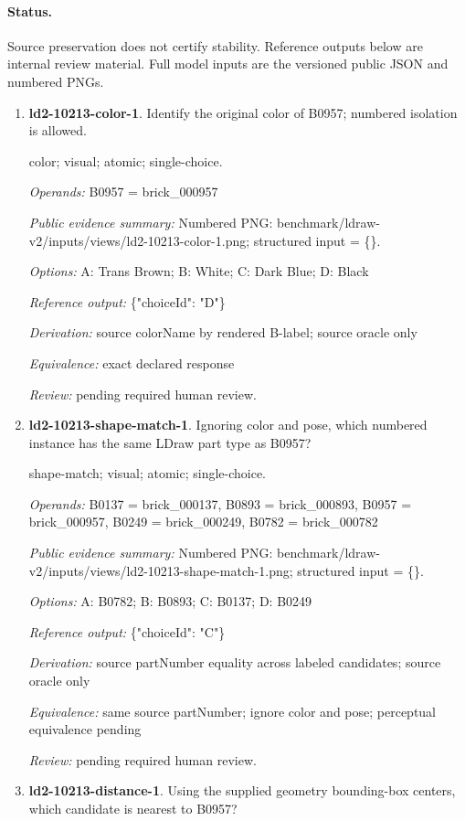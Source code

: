 \paragraph{Status.}Source preservation does not certify stability. Reference outputs below are internal review material. Full model inputs are the versioned public JSON and numbered PNGs.
\begin{enumerate}
\item \textbf{ld2-10213-color-1}. Identify the original color of B0957; numbered isolation is allowed.
\par{\small color; visual; atomic; single-choice.\par\textit{Operands:} B0957 = brick\_000957\par\textit{Public evidence summary:} Numbered PNG: benchmark/ldraw-v2/inputs/views/ld2-10213-color-1.png; structured input = \{\}.\par\textit{Options:} A: Trans Brown; B: White; C: Dark Blue; D: Black\par\textit{Reference output:} \{"choiceId": "D"\}\par\textit{Derivation:} source colorName by rendered B-label; source oracle only\par\textit{Equivalence:} exact declared response\par\textit{Review:} pending required human review.}
\item \textbf{ld2-10213-shape-match-1}. Ignoring color and pose, which numbered instance has the same LDraw part type as B0957?
\par{\small shape-match; visual; atomic; single-choice.\par\textit{Operands:} B0137 = brick\_000137, B0893 = brick\_000893, B0957 = brick\_000957, B0249 = brick\_000249, B0782 = brick\_000782\par\textit{Public evidence summary:} Numbered PNG: benchmark/ldraw-v2/inputs/views/ld2-10213-shape-match-1.png; structured input = \{\}.\par\textit{Options:} A: B0782; B: B0893; C: B0137; D: B0249\par\textit{Reference output:} \{"choiceId": "C"\}\par\textit{Derivation:} source partNumber equality across labeled candidates; source oracle only\par\textit{Equivalence:} same source partNumber; ignore color and pose; perceptual equivalence pending\par\textit{Review:} pending required human review.}
\item \textbf{ld2-10213-distance-1}. Using the supplied geometry bounding-box centers, which candidate is nearest to B0957?

\end{enumerate}
